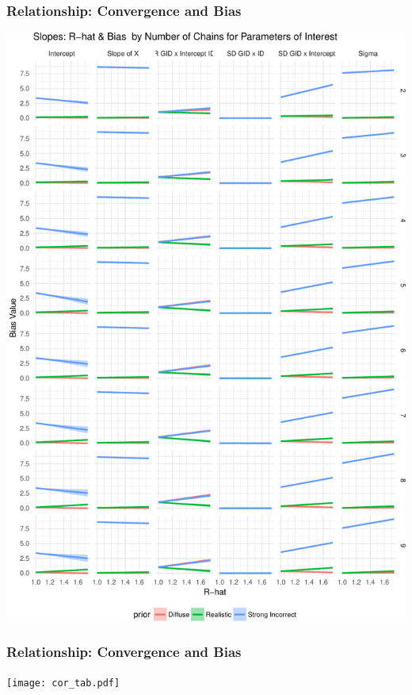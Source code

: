 \documentclass{beamer}
\begin{document}
\begin{frame}
	\frametitle{Relationship: Convergence and Bias}
	\begin{center}
		\includegraphics[scale=.30]{Slopes.pdf}
	\end{center}
\end{frame}

\begin{frame}
	\frametitle{Relationship: Convergence and Bias}
	\begin{center}

		\texttt{[image: cor\_tab.pdf]}

	\end{center}
\end{frame}
\end{document}
